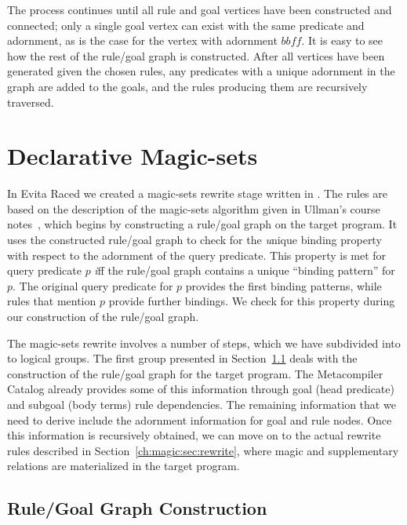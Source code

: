 The process continues until all rule and goal vertices have been constructed
and connected; only a single goal vertex can exist with the same predicate and
adornment, as is the case for the  vertex with adornment
$\mathit{bbff}$.  It is easy to see how the rest of the rule/goal graph is
constructed.  After all vertices have been generated given the chosen rules,
any predicates with a unique adornment in the graph are added to the goals, and
the rules producing them are recursively traversed.

\section{Declarative Magic-sets}
\label{ch:magic:sec:rules}

In Evita Raced we created a magic-sets rewrite stage written in \OVERLOG.  The
\OVERLOG rules are based on the description of the magic-sets algorithm given
in Ullman's course notes~\cite{ullmanNotes}, which begins by constructing a
rule/goal graph on the target program.  It uses the constructed rule/goal graph
to check for the {\emph unique binding property} with respect to the adornment
of the query predicate.  This property is met for query predicate $p$ {\emph
iff} the rule/goal graph contains a unique ``binding pattern'' for $p$.  The
original query predicate for $p$ provides the first binding patterns, while
rules that mention $p$ provide further bindings.  We check for this property
during our construction of the rule/goal graph.

The magic-sets rewrite involves a number of steps, which we have subdivided
into to logical groups. The first group presented in Section~\ref{ch:magic:sec:rgconstruct}
deals with the construction of the rule/goal graph for the target program.
The Metacompiler Catalog already provides some of this information through
goal (head predicate) and subgoal (body terms) rule dependencies. The remaining
information that we need to derive include the adornment information for goal and
rule nodes. Once this information is recursively obtained, we can move on to
the actual rewrite rules described in Section~\ref{ch:magic:sec:rewrite}, where
magic and supplementary relations are materialized in the target program.

\subsection{Rule/Goal Graph Construction}
\label{ch:magic:sec:rgconstruct}

